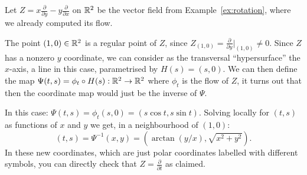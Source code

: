 \begin{example}\label{ex:hyplin}
	Let $Z = x\frac{\partial}{\partial y} - y\frac{\partial}{\partial x}$ on $\mathbb{R}^2$ be the vector field from Example~\ref{ex:rotation}, where we already computed its flow.

	The point $(1,0)\in\mathbb{R}^2$ is a regular point of $Z$, since $Z_{(1,0)} = \frac{\partial}{\partial y}\Big|_{(1,0)} \neq 0$.
	Since $Z$ has a nonzero $y$ coordinate, we can consider as the transversal ``hypersurface'' the $x$-axis, a line in this case, parametrised by $H(s) = (s,0)$.
	We can then define the map $\Psi(t,s) = \phi_t\circ H(s) : \mathbb{R}^2\to\mathbb{R}^2$ where $\phi_t$ is the flow of $Z$, it turns out that then the coordinate map would just be the inverse of $\Psi$.

	In this case: $\Psi(t,s) = \phi_t(s,0) = (s\cos t, s\sin t)$.
	Solving locally for $(t,s)$ as functions of $x$ and $y$ we get, in a neighbourhood of $(1,0)$:
	\begin{equation}
		(t,s) = \Psi^{-1}(x,y) = \left(\arctan(y/x), \sqrt{x^2+y^2}\right).
	\end{equation}
	In these new coordinates, which are just polar coordinates labelled with different symbols, you can directly check that $Z = \frac{\partial}{\partial t}$ as claimed.
\end{example}

